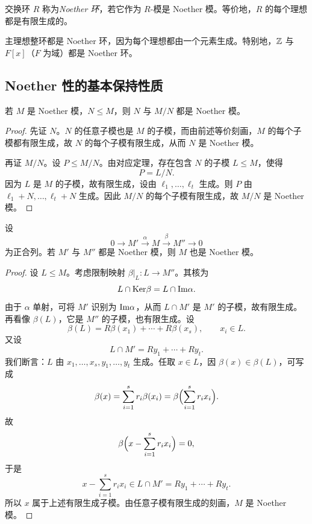 \begin{definition}
交换环 $R$ 称为\emph{Noether 环}，若它作为 $R$-模是 Noether 模。等价地，$R$ 的每个理想都是有限生成的。
\end{definition}

\begin{example}
主理想整环都是 Noether 环，因为每个理想都由一个元素生成。特别地，$\mathbb{Z}$ 与 $F[x]$（$F$ 为域）都是 Noether 环。
\end{example}

\subsection{Noether 性的基本保持性质}

\begin{proposition}
若 $M$ 是 Noether 模，$N\le M$，则 $N$ 与 $M/N$ 都是 Noether 模。
\end{proposition}

\begin{proof}
先证 $N$。$N$ 的任意子模也是 $M$ 的子模，而由前述等价刻画，$M$ 的每个子模都有限生成，故 $N$ 的每个子模有限生成，从而 $N$ 是 Noether 模。

再证 $M/N$。设 $P\le M/N$。由对应定理，存在包含 $N$ 的子模 $L\le M$，使得
\[
P=L/N.
\]
因为 $L$ 是 $M$ 的子模，故有限生成，设由 $\ell_1,\dots,\ell_t$ 生成。则 $P$ 由 $\ell_1+N,\dots,\ell_t+N$ 生成。因此 $M/N$ 的每个子模有限生成，故 $M/N$ 是 Noether 模。
\end{proof}

\begin{proposition}
设
\[
0\longrightarrow M'\xrightarrow{\alpha} M\xrightarrow{\beta} M''\longrightarrow 0
\]
为正合列。若 $M'$ 与 $M''$ 都是 Noether 模，则 $M$ 也是 Noether 模。
\end{proposition}

\begin{proof}
设 $L\le M$。考虑限制映射 $\beta|_L\colon L\to M''$。其核为
\[
L\cap \mathrm{Ker}\beta=L\cap \mathrm{Im}\alpha.
\]
由于 $\alpha$ 单射，可将 $M'$ 识别为 $\mathrm{Im}\alpha$，从而 $L\cap M'$ 是 $M'$ 的子模，故有限生成。再看像 $\beta(L)$，它是 $M''$ 的子模，也有限生成。设
\[
\beta(L)=R\beta(x_1)+\cdots+R\beta(x_s),\qquad x_i\in L.
\]
又设
\[
L\cap M'=Ry_1+\cdots+Ry_t.
\]
我们断言：$L$ 由 $x_1,\dots,x_s,y_1,\dots,y_t$ 生成。任取 $x\in L$，因 $\beta(x)\in \beta(L)$，可写成
\[
\beta(x)=\sum_{i=1}^s r_i\beta(x_i)=\beta\Bigl(\sum_{i=1}^s r_ix_i\Bigr).
\]
故
\[
\beta\Bigl(x-\sum_{i=1}^s r_ix_i\Bigr)=0,
\]
于是
\[
x-\sum_{i=1}^s r_ix_i\in L\cap M'=Ry_1+\cdots+Ry_t.
\]
所以 $x$ 属于上述有限生成子模。由任意子模有限生成的刻画，$M$ 是 Noether 模。
\end{proof}

